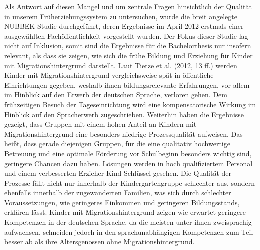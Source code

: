 Als Antwort auf diesen Mangel und um zentrale Fragen
hinsichtlich der Qualität in unserem Früherziehungssystem zu
untersuchen, wurde die breit angelegte NUBBEK-Studie durchgeführt, deren Ergebnisse im April 2012 erstmals einer ausgewählten Fachöffentlichkeit vorgestellt wurden. 
Der Fokus dieser Studie lag nicht auf Inklusion, somit sind die Ergebnisse für die Bachelorthesis nur insofern relevant, als dass sie zeigen, wie sich die frühe Bildung und Erziehung für Kinder mit Migrationshintergrund darstellt. 
Laut Tietze et al. (2012, 13 ff.) werden Kinder mit Migrationshintergrund vergleichsweise spät in öffentliche Einrichtungen  gegeben, weshalb ihnen bildungsrelevante Erfahrungen, vor allem im Hinblick auf den Erwerb der deutschen Sprache, verloren gehen. Dem frühzeitigen Besuch der Tageseinrichtung wird eine kompensatorische Wirkung im Hinblick auf den Spracherwerb zugeschrieben. Weiterhin haben die Ergebnisse gezeigt, dass Gruppen mit einem hohen Anteil an Kindern mit Migrationshintergrund eine besonders niedrige Prozessqualität aufweisen. Das heißt, dass gerade diejenigen Gruppen, für die eine qualitativ hochwertige Betreuung und eine optimale Förderung vor Schulbeginn besonders wichtig sind, geringere Chancen dazu haben.
Lösungen werden in hoch qualifiziertem Personal und einem verbesserten
Erzieher-Kind-Schlüssel gesehen. 
Die Qualität der Prozesse fällt nicht nur innerhalb der Kindergartengruppe schlechter aus, sondern ebenfalls innerhalb der zugewanderten Familien, was sich durch schlechter Voraussetzungen, wie  geringeres Einkommen und geringeren Bildungsstands, erklären lässt. 
Kinder mit Migrationshintergrund zeigen wie erwartet geringere Kompetenzen in der deutschen Sprache, da die meisten unter ihnen zweisprachig aufwachsen, schneiden jedoch in den sprachunabhängigen Kompetenzen zum Teil besser ab als ihre Altersgenossen ohne Migrationshintergrund.
  
